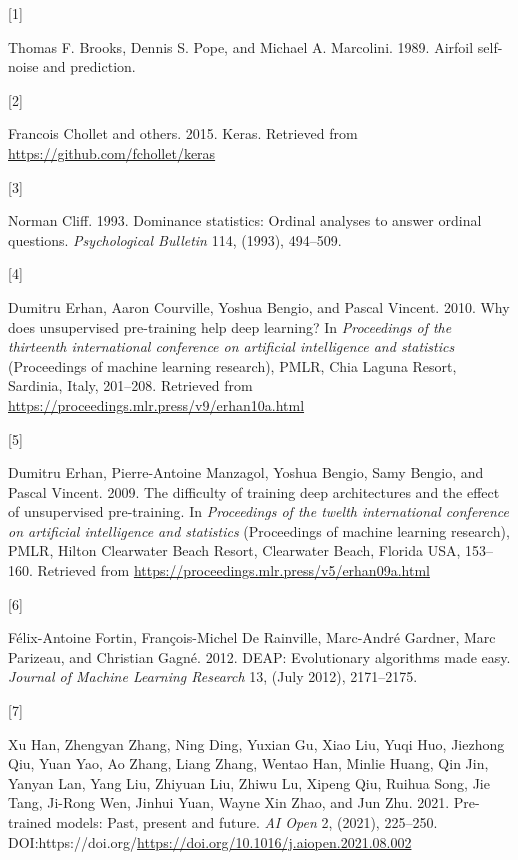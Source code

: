 \documentclass[
  11pt,
]{article}
\newlength{\cslhangindent}
\newlength{\csllabelwidth}
\newlength{\cslentryspacingunit} %
\newenvironment{CSLReferences}[2] %
 {%
  \setlength{\parindent}{0pt}
  \ifodd #1
  \let\oldpar\par
  \def\par{\hangindent=\cslhangindent\oldpar}
  \fi
  \setlength{\parskip}{#2\cslentryspacingunit}
 }%
 {}
\newcommand{\CSLLeftMargin}[1]{\parbox[t]{\csllabelwidth}{#1}}
\newcommand{\CSLRightInline}[1]{\parbox[t]{\linewidth - \csllabelwidth}{#1}\break}
\begin{document}
\hypertarget{refs}{}
\begin{CSLReferences}{0}{0}
\leavevmode{}%
\CSLLeftMargin{{[}1{]} }%
\CSLRightInline{Thomas F. Brooks, Dennis S. Pope, and Michael A. Marcolini. 1989. Airfoil self-noise and prediction. }

\leavevmode{}%
\CSLLeftMargin{{[}2{]} }%
\CSLRightInline{Francois Chollet and others. 2015. Keras. Retrieved from \url{https://github.com/fchollet/keras}}

\leavevmode{}%
\CSLLeftMargin{{[}3{]} }%
\CSLRightInline{Norman Cliff. 1993. Dominance statistics: Ordinal analyses to answer ordinal questions. \emph{Psychological Bulletin} 114, (1993), 494--509.}

\leavevmode{}%
\CSLLeftMargin{{[}4{]} }%
\CSLRightInline{Dumitru Erhan, Aaron Courville, Yoshua Bengio, and Pascal Vincent. 2010. Why does unsupervised pre-training help deep learning? In \emph{Proceedings of the thirteenth international conference on artificial intelligence and statistics} (Proceedings of machine learning research), PMLR, Chia Laguna Resort, Sardinia, Italy, 201--208. Retrieved from \url{https://proceedings.mlr.press/v9/erhan10a.html}}

\leavevmode{}%
\CSLLeftMargin{{[}5{]} }%
\CSLRightInline{Dumitru Erhan, Pierre-Antoine Manzagol, Yoshua Bengio, Samy Bengio, and Pascal Vincent. 2009. The difficulty of training deep architectures and the effect of unsupervised pre-training. In \emph{Proceedings of the twelth international conference on artificial intelligence and statistics} (Proceedings of machine learning research), PMLR, Hilton Clearwater Beach Resort, Clearwater Beach, Florida USA, 153--160. Retrieved from \url{https://proceedings.mlr.press/v5/erhan09a.html}}

\leavevmode{}%
\CSLLeftMargin{{[}6{]} }%
\CSLRightInline{Félix-Antoine Fortin, François-Michel De Rainville, Marc-André Gardner, Marc Parizeau, and Christian Gagné. 2012. {DEAP}: Evolutionary algorithms made easy. \emph{Journal of Machine Learning Research} 13, (July 2012), 2171--2175.}

\leavevmode{}%
\CSLLeftMargin{{[}7{]} }%
\CSLRightInline{Xu Han, Zhengyan Zhang, Ning Ding, Yuxian Gu, Xiao Liu, Yuqi Huo, Jiezhong Qiu, Yuan Yao, Ao Zhang, Liang Zhang, Wentao Han, Minlie Huang, Qin Jin, Yanyan Lan, Yang Liu, Zhiyuan Liu, Zhiwu Lu, Xipeng Qiu, Ruihua Song, Jie Tang, Ji-Rong Wen, Jinhui Yuan, Wayne Xin Zhao, and Jun Zhu. 2021. Pre-trained models: Past, present and future. \emph{AI Open} 2, (2021), 225--250. DOI:https://doi.org/\url{https://doi.org/10.1016/j.aiopen.2021.08.002}}


\end{CSLReferences}
\end{document}
